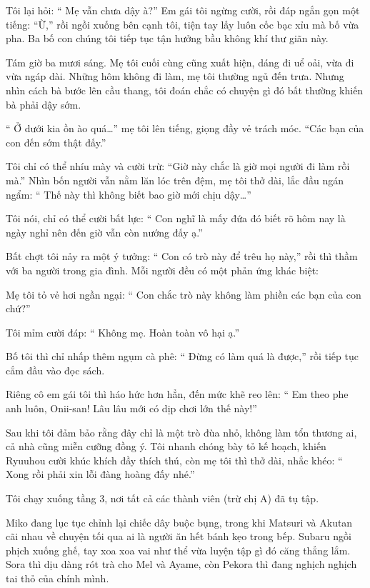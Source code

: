 \documentclass[../main.tex]{subfiles}
\begin{document}
Tôi lại hỏi: ``{\color{red} Mẹ vẫn chưa dậy à?}'' Em gái tôi ngừng cười, rồi đáp ngắn gọn một tiếng: ``Ừ,'' rồi ngồi xuống bên cạnh tôi, tiện tay lấy luôn cốc bạc xỉu mà bố vừa pha. Ba bố con chúng tôi tiếp tục tận hưởng bầu không khí thư giãn này.

\ct

Tám giờ ba mươi sáng. Mẹ tôi cuối cùng cũng xuất hiện, dáng đi uể oải, vừa đi vừa ngáp dài. Những hôm không đi làm, mẹ tôi thường ngủ đến trưa. Nhưng nhìn cách bà bước lên cầu thang, tôi đoán chắc có chuyện gì đó bất thường khiến bà phải dậy sớm.

``{\color{red} Ở dưới kia ồn ào quá\dots}'' mẹ tôi lên tiếng, giọng đầy vẻ trách móc. ``Các bạn của con đến sớm thật đấy.''

Tôi chỉ có thể nhíu mày và cười trừ: ``{\color{red}Giờ này chắc là giờ mọi người đi làm rồi mà.}'' Nhìn bốn người vẫn nằm lăn lóc trên đệm, mẹ tôi thở dài, lắc đầu ngán ngẩm: ``{\color{red} Thế này thì không biết bao giờ mới chịu dậy\dots}''

Tôi nói, chỉ có thể cười bất lực: ``{\color{red} Con nghĩ là mấy đứa đó biết rõ hôm nay là ngày nghỉ nên đến giờ vẫn còn nướng đấy ạ.}''

Bất chợt tôi nảy ra một ý tưởng: ``{\color{red} Con có trò này để trêu họ này,}'' rồi thì thầm với ba người trong gia đình. Mỗi người đều có một phản ứng khác biệt:

Mẹ tôi tỏ vẻ hơi ngần ngại: ``{\color{red} Con chắc trò này không làm phiền các bạn của con chứ?}''

Tôi mỉm cười đáp: ``{\color{red} Không mẹ. Hoàn toàn vô hại ạ.}''

Bố tôi thì chỉ nhấp thêm ngụm cà phê: ``{\color{red} Đừng có làm quá là được,}'' rồi tiếp tục cắm đầu vào đọc sách.

Riêng cô em gái tôi thì háo hức hơn hẳn, đến mức khẽ reo lên: ``{\color{red} Em theo phe anh luôn, Onii-san! Lâu lâu mới có dịp chơi lớn thế này!}''

Sau khi tôi đảm bảo rằng đây chỉ là một trò đùa nhỏ, không làm tổn thương ai, cả nhà cũng miễn cưỡng đồng ý. Tôi nhanh chóng bày tỏ kế hoạch, khiến Ryuuhou cười khúc khích đầy thích thú, còn mẹ tôi thì thở dài, nhắc khéo: ``{\color{red} Xong rồi phải xin lỗi đàng hoàng đấy nhé.}''

\ct

Tôi chạy xuống tầng 3, nơi tất cả các thành viên (trừ chị A) đã tụ tập.

Miko đang lục tục chỉnh lại chiếc dây buộc bụng, trong khi Matsuri và Akutan cãi nhau về chuyện tối qua ai là người ăn hết bánh kẹo trong bếp. Subaru ngồi phịch xuống ghế, tay xoa xoa vai như thể vừa luyện tập gì đó căng thẳng lắm. Sora thì dịu dàng rót trà cho Mel và Ayame, còn Pekora thì đang nghịch nghịch tai thỏ của chính mình.
\end{document}
